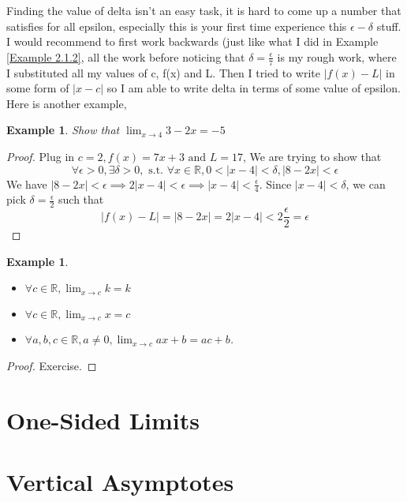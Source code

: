 \documentclass{book}
\newtheorem{example}[theorem]{Example}
\begin{document}
Finding the value of delta isn't an easy task, it is hard to come up a number that satisfies for all epsilon, especially this is your first time experience this $\epsilon-\delta$ stuff. I would recommend to first work backwards (just like what I did in Example \ref{Example 2.1.2}, all the work before noticing that $\delta = \frac{\epsilon}{7}$ is my rough work, where I substituted all my values of c, f(x) and L. Then I tried to write $|f(x) - L|$ in some form of $|x - c|$ so I am able to write delta in terms of some value of epsilon. Here is another example,

\begin{example}
    Show that $\lim_{x \rightarrow 4} 3 - 2x = -5$
\end{example}

\begin{proof}
    Plug in $c = 2,f(x) = 7x + 3 \text{ and } L = 17$, We are trying to show that 
    $$\forall \epsilon > 0, \exists \delta > 0, \text{ s.t. } \forall x \in \mathbb{R}, 0 < |x - 4| < \delta, |8 - 2x| < \epsilon$$
    We have $|8 - 2x| < \epsilon \implies 2|x - 4| < \epsilon \implies |x - 4| < \frac{\epsilon}{4}$. Since $|x - 4| < \delta$, we can pick $\delta = \frac{\epsilon}{2}$ such that
    $$|f(x) - L| = |8 - 2x| = 2|x - 4| < 2 \frac{\epsilon}{2} = \epsilon$$
\end{proof}

\begin{example}
    \begin{itemize}
        \item[(1)] $\forall c \in \mathbb{R}, \lim_{x \rightarrow c} k = k$
        \item[(2)] $\forall c \in \mathbb{R}, \lim_{x \rightarrow c} x = c$
        \item[(3)] $\forall a, b, c \in \mathbb{R}, a \neq 0, \lim_{x \rightarrow c} ax + b = ac + b$.
    \end{itemize}
\end{example}

\begin{proof}
    Exercise.
\end{proof}

\section{One-Sided Limits}
\section{Vertical Asymptotes}
\end{document}
